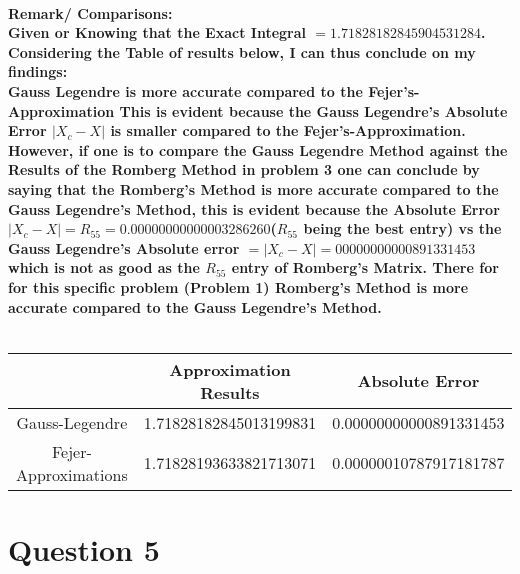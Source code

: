 \documentclass{article}
\begin{document}
\textbf{\\Remark/ Comparisons:\\ Given or Knowing that the Exact Integral $= 1.71828182845904531284$. Considering the Table of results below, I can thus conclude on my findings:\\ Gauss Legendre is more accurate compared to the Fejer's-Approximation This is evident because the Gauss Legendre's Absolute Error $|X_c - X|$ is smaller compared to the Fejer's-Approximation. However, if one is to compare the Gauss Legendre Method against the Results of the Romberg Method in problem 3 one can conclude by saying that the Romberg's Method is more accurate compared to the Gauss Legendre's Method, this is evident because the Absolute Error $|X_c - X| = R_{55} = 0.00000000000003286260 $($R_{55}$ being the best entry) vs the  Gauss Legendre's Absolute error  $ = |X_c - X| = 00000000000891331453$ which is not as good as the $R_{55} $ entry of Romberg's Matrix. There for for this specific problem (Problem 1) Romberg's Method is more accurate compared to the Gauss Legendre's Method.\\ \\ }
\begin{center}
\begin{tabular}{ |c|c|c| } 
 \hline \hline
                      & Approximation Results  & Absolute Error \\ 
\hline \hline       
 Gauss-Legendre       & 1.71828182845013199831 & 0.00000000000891331453 \\ 
 \hline
 Fejer-Approximations & 1.71828193633821713071 & 0.00000010787917181787 \\ 
 \hline
\end{tabular}
\end{center}


\pagebreak

\section*{Question 5}
\end{document}
